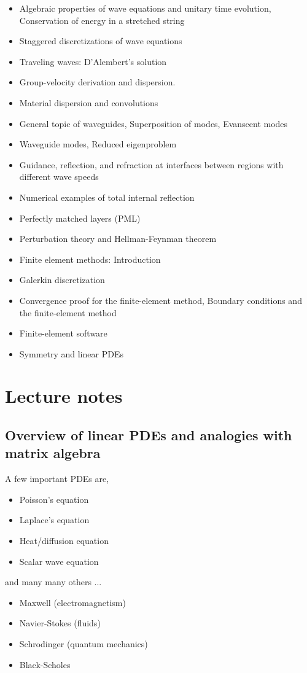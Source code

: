 \documentclass{article}
\theoremstyle{mytheoremstyle}
\theoremstyle{mytheoremstyle}
\theoremstyle{myproblemstyle}
\begin{document}
\begin{itemize}
	\item Algebraic properties of wave equations and unitary time
		evolution, Conservation of energy in a stretched string
	\item Staggered discretizations of wave equations
	\item Traveling waves: D'Alembert's solution
	\item Group-velocity derivation and dispersion.
	\item Material dispersion and convolutions
	\item General topic of waveguides, Superposition of modes,
		Evanscent modes
	\item Waveguide modes, Reduced eigenproblem
	\item Guidance, reflection, and refraction at interfaces between
		regions with different wave speeds
	\item Numerical examples of total internal reflection
	\item Perfectly matched layers (PML)
	\item Perturbation theory and Hellman-Feynman theorem
	\item Finite element methods: Introduction
	\item Galerkin discretization
	\item Convergence proof for the finite-element method, Boundary
		conditions and the finite-element method
	\item Finite-element software
	\item Symmetry and linear PDEs
    \end{itemize}

    \section{Lecture notes}
    \subsection{Overview of linear PDEs and analogies with matrix algebra}

    \noindent A few important PDEs are,
    \begin{itemize}
    	\item Poisson's equation
	\item Laplace's equation
	\item Heat/diffusion equation
	\item Scalar wave equation
    \end{itemize}

    \noindent and many many others ...
    \begin{itemize}
	\item Maxwell (electromagnetism)
	\item Navier-Stokes (fluids)
	\item Schrodinger (quantum mechanics)
	\item Black-Scholes
    \end{itemize}

    
\end{document}
